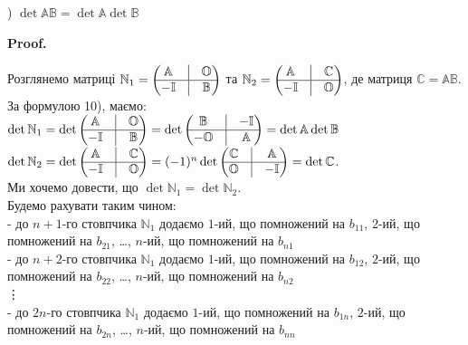 \documentclass[a4paper, 10pt]{article}
\makeatletter
\theoremstyle{theoremdd}
\renewenvironment{proof}[1][Proof.\\]{\par
\pushQED{\hfill \qed}%
\normalfont \topsep6\p@\@plus6\p@\relax
\trivlist
\item\relax
{\bfseries
#1\@addpunct{.}}\hspace\labelsep\ignorespaces
}{%
\popQED\endtrivlist\@endpefalse
}
\makeatother
\begin{document}
) $\det \mathbb{A} \mathbb{B} = \det \mathbb{A} \det \mathbb{B}$

\begin{proof}
Розглянемо матриці $\mathbb{N}_1 = \begin{pmatrix}
 \mathbb{A} & \vline & \mathbb{O} \\
 \hline
 -\mathbb{I} & \vline & \mathbb{B}
\end{pmatrix}$ та $\mathbb{N}_2 = \begin{pmatrix}
 \mathbb{A} & \vline & \mathbb{C} \\
 \hline
 -\mathbb{I} & \vline & \mathbb{O}
\end{pmatrix}$, де матриця $\mathbb{C} = \mathbb{A} \mathbb{B}$. За формулою 10), маємо:\\
$\det \mathbb{N}_1 = \det \begin{pmatrix}
 \mathbb{A} & \vline & \mathbb{O} \\
 \hline
 -\mathbb{I} & \vline & \mathbb{B}
\end{pmatrix} = \det \begin{pmatrix}
 \mathbb{B} & \vline & -\mathbb{I} \\
 \hline
 -\mathbb{O} & \vline & \mathbb{A}
\end{pmatrix} = \det \mathbb{A} \det \mathbb{B}$ \\ $\det \mathbb{N}_2 = \det \begin{pmatrix}
 \mathbb{A} & \vline & \mathbb{C} \\
 \hline
 -\mathbb{I} & \vline & \mathbb{O}
\end{pmatrix} = (-1)^n \det \begin{pmatrix}
 \mathbb{C} & \vline & \mathbb{A} \\
 \hline
 \mathbb{O} & \vline & -\mathbb{I}
\end{pmatrix} = \det \mathbb{C}$.\\
Ми хочемо довести, що $\det \mathbb{N}_1 = \det \mathbb{N}_2$.\\
Будемо рахувати таким чином:\\
- до $n+1$-го стовпчика $\mathbb{N}_1$ додаємо $1$-ий, що помножений на $b_{11}$, $2$-ий, що помножений на $b_{21}$, \dots , $n$-ий, що помножений на $b_{n1}$\\
- до $n+2$-го стовпчика $\mathbb{N}_1$ додаємо $1$-ий, що помножений на $b_{12}$, $2$-ий, що помножений на $b_{22}$, \dots , $n$-ий, що помножений на $b_{n2}$\\
\vdots \\
- до $2n$-го стовпчика $\mathbb{N}_1$ додаємо $1$-ий, що помножений на $b_{1n}$, $2$-ий, що помножений на $b_{2n}$, \dots , $n$-ий, що помножений на $b_{nn}$\\

\end{proof}
\end{document}
